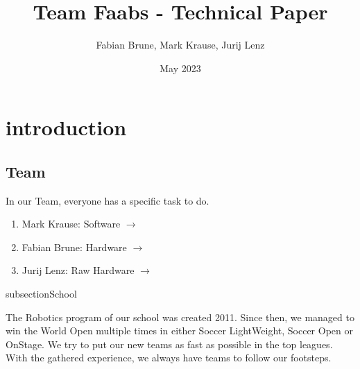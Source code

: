 \documentclass{scrartcl}
\title{Team Faabs - Technical Paper}
\author{Fabian Brune, Mark Krause, Jurij Lenz}
\date{May 2023}
\begin{document}
    \maketitle

    \newpage


    \tableofcontents
     \newpage


    \section{introduction}
    \subsection{Team}

    In our Team, everyone has a specific task to do.
\begin{enumerate}
    \item{Mark Krause: Software $\rightarrow$ }
    \item{Fabian Brune: Hardware  $\rightarrow$ }
    \item{Jurij Lenz: Raw Hardware $\rightarrow$ }
\end{enumerate}
\newpage

subsection{School}

The Robotics program of our school was created 2011. Since then, we managed to win the World Open
multiple times in either Soccer LightWeight, Soccer Open or OnStage.
We try to put our new teams as fast as possible in the top leagues. With the gathered experience, we always
have teams to follow our footsteps.
\newline
\end{document}
